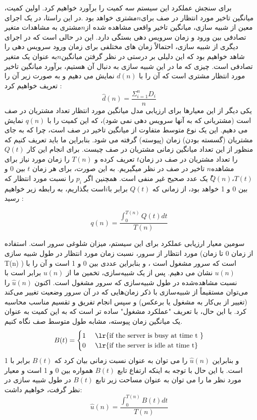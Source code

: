 \documentclass[12pt,a4paper]{report}
\begin{document}
	برای سنجش عملکرد این سیستم سه کمیت را برآورد خواهیم کرد. اولین کمیت، میانگین تاخیر مورد انتظار در صف برای$ n $مشتری خواهد بود .در این راستا، در یک اجرای معین از شبیه سازی، میانگین تاخیر واقعی مشاهده شده از$ n $مشتری به مشاهدات متغیر تصادفی بین ورود و زمان سرویس دهی بستگی دارد. این در حالی است که در اجرای دیگری از شبیه سازی، احتمالاً زمان های مختلفی برای زمان ورود سرویس دهی را شاهد خواهیم بود که این دلیلی بر درستی در نظر گرفتن میانگین$ n $به عنوان یک متغیر تصادفی است. چیزی که ما در این شبیه سازی به دنبال آن هستیم، برآورد میانگین تاخیر مورد انتظار  مشتری است که آن را با $d(n)$ نمایش می دهیم و به صورت زیر آن را تعریف خواهیم کرد :
	\begin{equation}
		\hat{d}(n) = \frac{\Sigma^n_{i = 1} D_i}{n}
	\end{equation}
	یکی دیگر از این معیارها برای ارزیابی مدل میانگین مورد انتظار تعداد مشتریان در صف است (مشتریانی که به آنها سرویس دهی نمی شود)، که این کمیت را با $q(n)$ نمایش می دهیم. این یک نوع متوسط متفاوت از میانگین تاخیر در صف است، چرا که به جای مشتریان (گسسته بودن) زمان (پیوسته) گرفته می شود. بنابراین ما باید تعریف کنیم که منظور از این تعداد میانگین زمانی مشتریان در صف چیست. برای انجام این کار $Q(t)$ را تعداد مشتریان در صف در زمان$ t$ تعریف کرده و $T(n)$ را زمان مورد نیاز برای مشاهده$ n$ تاخیر در صف در نظر میگیریم. به این صورت، برای هر زمان $t$ بین 0 و $T(t)$،$ًًQ(n)$ یک عدد صحیح غیر منفی است. همچنین اگر $p_i$ را نسبت مورد انتظار که بین 0 و 1 خواهد بود، از زمانی که $Q(t)$ برابر با$ i $است بگذاریم، به رابطه زیر خواهیم رسید :
	
	\begin{equation}
		\hat{q}(n) = \frac{\int^{T(n)}_0 Q(t) dt}{T(n)}
	\end{equation}

	سومین معیار ارزیابی عملکرد برای این سیستم، میزان شلوغی سرور است. استفاده مورد انتظار از سرور، نسبت زمان مورد انتظار در طول شبیه سازی (از زمان 0 تا زمان T(n) ) است که سرور مشغول است ، و بنابراین عددی بین 0 و 1 است و آن را با $u(n)$ نشان می دهیم. پس از یک شبیه‌سازی، تخمین ما از $u(n)$ برابر است با نسبت مشاهده‌شده در طول شبیه‌سازی که سرور مشغول است. اکنون $\hat{u}(n)$ را می‌توان مستقیماً از شبیه‌سازی با ذکر زمان‌هایی که در آن سرور وضعیت تغییر می‌کند (تغییر از بی‌کار به مشغول یا برعکس) و سپس انجام تفریق و تقسیم مناسب محاسبه کرد. با این حال، با تعریف "عملکرد مشغول" ساده تر است که به این کمیت به عنوان یک میانگین زمان پیوسته، مشابه طول متوسط صف نگاه کنیم.
	\begin{align*}
		B(t) = 
		\begin{cases}
			1 & $ \lr{if the server is busy at time t }$ \\
			0 & $ \lr{if the server is idle at time t} $
		\end{cases}
	\end{align*}
	و بنابراین $\hat{u}(n)$ را می توان به عنوان نسبت زمانی بیان کرد که $B(t)$ برابر با 1 است. با این حال با توجه به اینکه ارتفاع تابع $B(t)$ همواره بین 0 و 1 است و معیار مورد نظر ما را می توان به عنوان مساحت زیر تابع $B(t)$ در طول شبیه سازی در نظر گرفت، خواهیم داشت:
	\begin{equation}
		\hat{u}(n) = \frac{\int^{T(n)}_0 B(t) dt}{T(n)}
	\end{equation}
\end{document}
